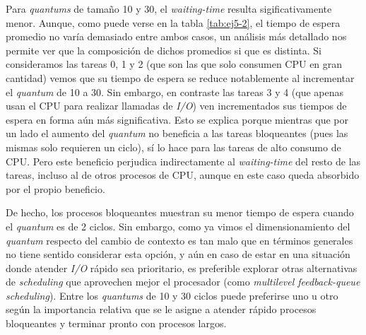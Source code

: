 Para \emph{quantums} de tamaño 10 y 30, el \emph{waiting-time} resulta sigificativamente menor. Aunque, como puede verse en la tabla \ref{tab:ej5-2}, el tiempo de espera promedio no varía demasiado entre ambos casos, un análisis más detallado nos permite ver que la composición de dichos promedios si que es distinta. Si consideramos las tareas 0, 1 y 2 (que son las que solo consumen CPU en gran cantidad) vemos que su tiempo de espera se reduce notablemente al incrementar el \emph{quantum} de 10 a 30. Sin embargo, en contraste las tareas 3 y 4 (que apenas usan el CPU para realizar llamadas de \emph{I/O}) ven incrementados sus tiempos de espera en forma aún más significativa. Esto se explica porque mientras que por un lado el aumento del \emph{quantum} no beneficia a las tareas bloqueantes (pues las mismas solo requieren un ciclo), sí lo hace para las tareas de alto consumo de CPU. Pero este beneficio perjudica indirectamente al \emph{waiting-time} del resto de las tareas, incluso al de otros procesos de CPU, aunque en este caso queda absorbido por el propio beneficio.

De hecho, los procesos bloqueantes muestran su menor tiempo de espera cuando el \emph{quantum} es de 2 ciclos. Sin embargo, como ya vimos el dimensionamiento del \emph{quantum} respecto del cambio de contexto es tan malo que en términos generales no tiene sentido considerar esta opción, y aún en caso de estar en una situación donde atender \emph{I/O} rápido sea prioritario, es preferible explorar otras alternativas de \emph{scheduling} que aprovechen mejor el procesador (como \emph{multilevel feedback-queue scheduling}). Entre los \emph{quantums} de 10 y 30 ciclos puede preferirse uno u otro según la importancia relativa que se le asigne a atender rápido procesos bloqueantes y terminar pronto con procesos largos.